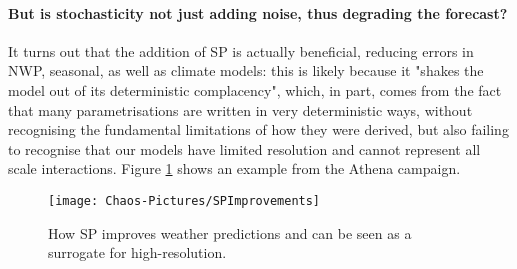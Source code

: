 \paragraph{But is stochasticity not just adding noise, thus degrading the forecast?}
It turns out that the addition of SP is actually beneficial, reducing errors in NWP, seasonal, as well as climate models: this is likely because it "shakes the model out of its deterministic complacency", which, in part, comes from the fact that many parametrisations are written in very deterministic ways, without recognising the fundamental limitations of how they were derived, but also failing to recognise that our models have limited resolution and cannot represent all scale interactions. Figure \ref{Fig:SPImprovements} shows an example from the Athena campaign.

\begin{figure}[h!]
	\texttt{[image: Chaos-Pictures/SPImprovements]}
	\caption{How SP improves weather predictions and can be seen as a surrogate for high-resolution.}
	\label{Fig:SPImprovements}
\end{figure}


